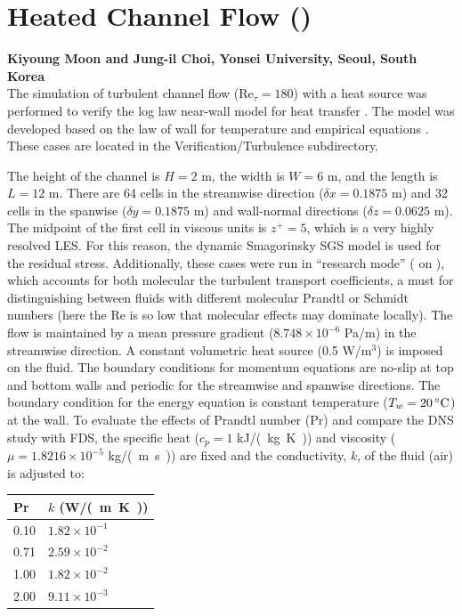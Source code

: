 \documentclass[11pt]{book}
\begin{document}
\newpage
\section{Heated Channel Flow (\texorpdfstring{}{heated\_channel})}

\textbf{Kiyoung Moon and Jung-il Choi, Yonsei University, Seoul, South Korea}\\

\noindent The simulation of turbulent channel flow (Re$_{\tau}=180$) with a heat source was performed to verify the log law near-wall model for heat transfer \cite{FDS_Tech_Guide}. The model was developed based on the law of wall for temperature and empirical equations \cite{Kader:1981}. These cases are located in the Verification/Turbulence subdirectory.

The height of the channel is $H=2$ m, the width is $W=6$ m, and the length is $L=12$ m. There are 64 cells in the streamwise direction ($\delta x = 0.1875$ m) and 32 cells in the spanwise ($\delta y=0.1875$ m) and wall-normal directions ($\delta z=0.0625$ m).  The midpoint of the first cell in viscous units is $z^+ = 5$, which is a very highly resolved LES. For this reason, the dynamic Smagorinsky SGS model is used for the residual stress. Additionally, these cases were run in ``research mode'' ( on ), which accounts for both molecular the turbulent transport coefficients, a must for distinguishing between fluids with different molecular Prandtl or Schmidt numbers (here the Re is so low that molecular effects may dominate locally).  The flow is maintained by a mean pressure gradient ($8.748 \times 10^{-6}$ Pa/m) in the streamwise direction. A constant volumetric heat source (0.5 W/m$^3$) is imposed on the fluid. The boundary conditions for momentum equations are no-slip at top and bottom walls and periodic for the streamwise and spanwise directions. The boundary condition for the energy equation is constant temperature ($T_w = 20 \,\mbox{\si{\degree C}} $) at the wall. To evaluate the effects of Prandtl number (Pr) and compare the DNS study \cite{Kim:1987} with FDS, the specific heat ($c_p = 1$ \si{kJ/(kg.K)}) and viscosity ($\mu = 1.8216 \times 10^{-5}$ \si{kg/(m.s)}) are fixed and the conductivity, $k$, of the fluid (air) is adjusted to:
\begin{center}
\begin{tabular}{ll}
Pr & $k$ (\si{W/(m.K)}) \\
\hline
0.10 & $1.82 \times 10^{-1}$ \\
0.71 & $2.59 \times 10^{-2}$ \\
1.00 & $1.82 \times 10^{-2}$ \\
2.00 & $9.11 \times 10^{-3}$
\end{tabular}
\end{center}
\end{document}
